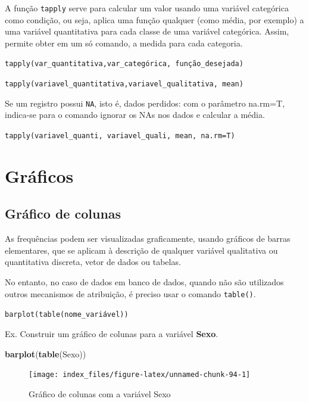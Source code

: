 \documentclass[12pt,brazil,oneside]{book}
\newenvironment{Shaded}{\begin{snugshade}}{\end{snugshade}}
\newcommand{\KeywordTok}[1]{\textcolor[rgb]{0.13,0.29,0.53}{\textbf{#1}}}
\newcommand{\NormalTok}[1]{#1}
\begin{document}
A função \texttt{tapply} serve para calcular um valor usando uma variável categórica como condição, ou seja, aplica uma função qualquer (como média, por exemplo) a uma variável quantitativa para cada classe de uma variável categórica. Assim, permite obter em um só comando, a medida para cada categoria.

\texttt{tapply(var\_quantitativa,var\_categórica,\ função\_desejada)}

\texttt{tapply(variavel\_quantitativa,variavel\_qualitativa,\ mean)}

Se um registro possui \texttt{NA}, isto é, dados perdidos: com o parâmetro na.rm=T, indica-se para o comando ignorar os NAs nos dados e calcular a média.

\texttt{tapply(variavel\_quanti,\ variavel\_quali,\ mean,\ na.rm=T)}

\hypertarget{graficos}{%
\section{Gráficos}\label{graficos}}

\hypertarget{grafico-de-colunas}{%
\subsection{Gráfico de colunas}\label{grafico-de-colunas}}

As frequências podem ser visualizadas graficamente, usando gráficos de barras elementares, que se aplicam à descrição de qualquer variável qualitativa ou quantitativa discreta, vetor de dados ou tabelas.

No entanto, no caso de dados em banco de dados, quando não são utilizados outros mecanismos de atribuição, é preciso usar o comando \texttt{table()}.

\texttt{barplot(table(nome\_variável))}

Ex. Construir um gráfico de colunas para a variável \textbf{Sexo}.

\begin{Shaded}
\begin{Highlighting}[]
\KeywordTok{barplot}\NormalTok{(}\KeywordTok{table}\NormalTok{(Sexo))}
\end{Highlighting}
\end{Shaded}

\begin{figure}[H]

{\centering \texttt{[image: index\_files/figure-latex/unnamed-chunk-94-1]} 

}

\caption{Gráfico de colunas com a variável Sexo}\label{fig:unnamed-chunk-94}
\end{figure}
\end{document}
